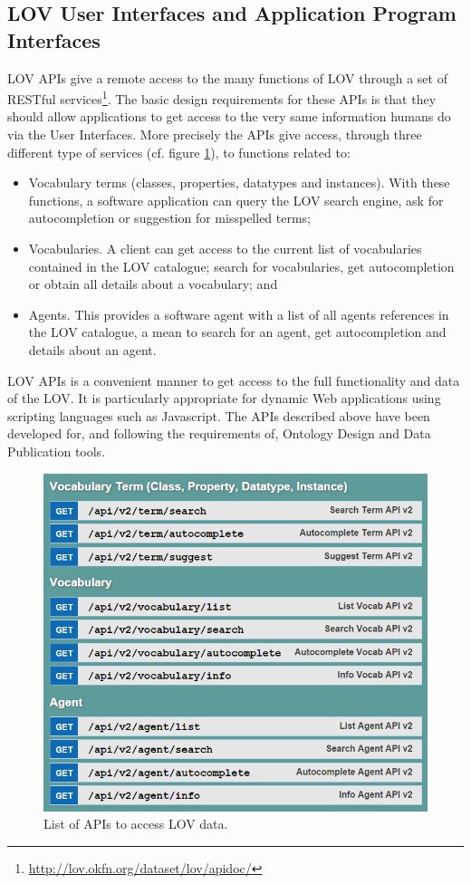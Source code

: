 \documentclass{iosart2c}
\begin{document}
\subsection{LOV User Interfaces and Application Program Interfaces}
LOV APIs give a remote access to the many functions of LOV through a set of RESTful services\footnote{\url{http://lov.okfn.org/dataset/lov/apidoc/}}. The basic design requirements for these APIs is that they should allow applications to get access to the very same information humans do via the User Interfaces. More precisely the APIs give access, through three different type of services (cf. figure \ref{fig:apis}), to functions related to:
\begin{itemize} 
			\item Vocabulary terms (classes, properties, datatypes and instances). With these functions, a software application can query the LOV search engine, ask for autocompletion or suggestion for misspelled terms;
			\item Vocabularies. A client can get access to the current list of vocabularies contained in the LOV catalogue; search for vocabularies, get autocompletion or obtain all details about a vocabulary; and
			\item Agents. This provides a software agent with a list of all agents references in the LOV catalogue, a mean to search for an agent, get autocompletion and details about an agent.
		\end{itemize}
LOV APIs is a convenient manner to get access to the full functionality and data of the LOV. It is particularly appropriate for dynamic Web applications using scripting languages such as Javascript. The APIs described above have been developed for, and following the requirements of, Ontology Design and Data Publication tools.

\begin{figure}[ht!b]
\includegraphics[scale=0.4]{apis.png}
\caption{List of APIs to access LOV data.}
\label{fig:apis}
\end{figure}
\end{document}
